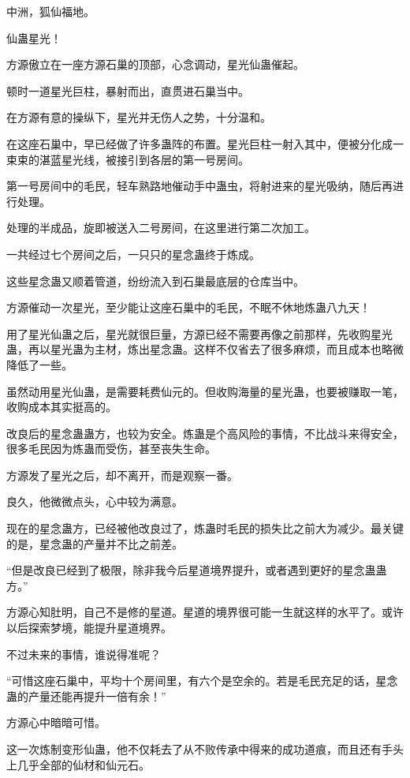 
\begin{this_body}

中洲，狐仙福地。

仙蛊星光！

方源傲立在一座方源石巢的顶部，心念调动，星光仙蛊催起。

顿时一道星光巨柱，暴射而出，直贯进石巢当中。

在方源有意的操纵下，星光并无伤人之势，十分温和。

在这座石巢中，早已经做了许多蛊阵的布置。星光巨柱一射入其中，便被分化成一束束的湛蓝星光线，被接引到各层的第一号房间。

第一号房间中的毛民，轻车熟路地催动手中蛊虫，将射进来的星光吸纳，随后再进行处理。

处理的半成品，旋即被送入二号房间，在这里进行第二次加工。

一共经过七个房间之后，一只只的星念蛊终于炼成。

这些星念蛊又顺着管道，纷纷流入到石巢最底层的仓库当中。

方源催动一次星光，至少能让这座石巢中的毛民，不眠不休地炼蛊八九天！

用了星光仙蛊之后，星光就很巨量，方源已经不需要再像之前那样，先收购星光蛊，再以星光蛊为主材，炼出星念蛊。这样不仅省去了很多麻烦，而且成本也略微降低了一些。

虽然动用星光仙蛊，是需要耗费仙元的。但收购海量的星光蛊，也要被赚取一笔，收购成本其实挺高的。

改良后的星念蛊蛊方，也较为安全。炼蛊是个高风险的事情，不比战斗来得安全，很多毛民因为炼蛊而受伤，甚至丧失生命。

方源发了星光之后，却不离开，而是观察一番。

良久，他微微点头，心中较为满意。

现在的星念蛊方，已经被他改良过了，炼蛊时毛民的损失比之前大为减少。最关键的是，星念蛊的产量并不比之前差。

“但是改良已经到了极限，除非我今后星道境界提升，或者遇到更好的星念蛊蛊方。”

方源心知肚明，自己不是修的星道。星道的境界很可能一生就这样的水平了。或许以后探索梦境，能提升星道境界。

不过未来的事情，谁说得准呢？

“可惜这座石巢中，平均十个房间里，有六个是空余的。若是毛民充足的话，星念蛊的产量还能再提升一倍有余！”

方源心中暗暗可惜。

这一次炼制变形仙蛊，他不仅耗去了从不败传承中得来的成功道痕，而且还有手头上几乎全部的仙材和仙元石。


\end{this_body}
